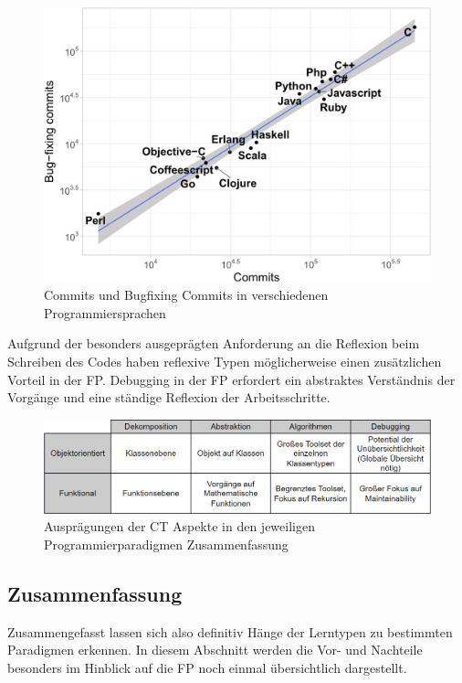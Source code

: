 \begin{figure}[H]
    \centering
    \includegraphics[width=1\linewidth]{Figures/Section_3/FigBugCommitsFP}
    \caption{Commits und Bugfixing Commits in verschiedenen Programmiersprachen \protect\cite{berger}}
\end{figure}

Aufgrund der besonders ausgeprägten Anforderung an die Reflexion beim Schreiben des Codes haben reflexive Typen möglicherweise einen zusätzlichen Vorteil in der FP.
Debugging in der FP erfordert ein abstraktes Verständnis der Vorgänge und eine ständige Reflexion der Arbeitsschritte.

\begin{figure}[H]
    \centering
    \includegraphics[width=1\linewidth]{Figures/Section_3/CT_Paradigms}
    \caption{Ausprägungen der CT Aspekte in den jeweiligen Programmierparadigmen Zusammenfassung}
\end{figure}

\subsection{Zusammenfassung}
Zusammengefasst lassen sich also definitiv Hänge der Lerntypen zu bestimmten Paradigmen erkennen. In diesem Abschnitt werden die Vor- und Nachteile besonders im Hinblick auf die FP noch einmal übersichtlich dargestellt.

